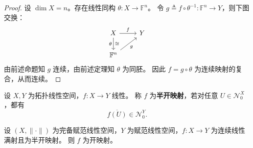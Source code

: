 \documentclass[lang=cn,a4paper,newtx,section]{elegantbook}
\begin{document}
\begin{proof}
  设 $\dim X=n$。存在线性同构 $\theta:X\to\mathbb{F}^n$。
  令 $g\triangleq f\circ\theta^{-1}:\mathbb{F}^n\to Y$，则下图交换：
  \[
    \begin{tikzcd}
      X \arrow[r,"f"] \arrow[d,"\theta"',"\cong"] & Y \\
      \mathbb{F}^n \arrow[ur,"g"']
    \end{tikzcd}
  \]
  由前述命题知 $g$ 连续，由前述定理知 $\theta$ 为同胚。
  因此 $f=g\circ\theta$ 为连续映射的复合，从而连续。
\end{proof}

\begin{definition}
  设 $X,Y$ 为拓扑线性空间，$f:X\to Y$ 线性。
  称 $f$ 为\textbf{半开映射}，若对任意 $U\in\mathcal{N}_0^X$，都有
  \[
    \overline{f(U)}\in\mathcal{N}_0^Y.
  \]
\end{definition}

\begin{lemma}\label{lem:semi-open-to-open}
  设 $(X,\|\cdot\|)$ 为完备赋范线性空间，$Y$ 为赋范线性空间，$f:X\to Y$ 为连续线性满射且为半开映射。
  则 $f$ 为开映射。
\end{lemma}
\end{document}
